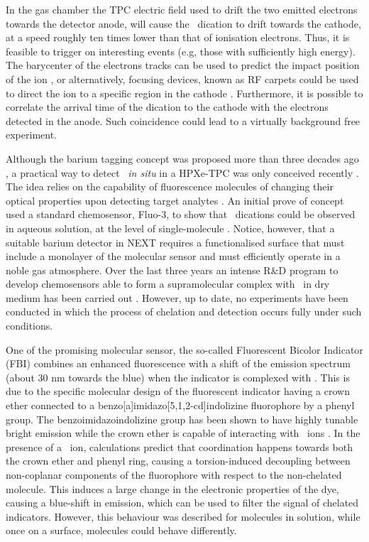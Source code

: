 \documentclass[aps,prl,reprint,longbibliography,superscriptaddress, english]{revtex4-1}
\begin{document}
In the gas chamber the TPC electric field used to drift the two emitted electrons towards the detector anode, will cause the \Bapp\ dication to drift towards the cathode, at a speed roughly ten times lower than that of ionisation electrons. Thus, it is feasible to trigger on interesting events (e.g, those with sufficiently high energy). The barycenter of the electrons tracks can be used to predict the impact position of the ion \cite{rivilla_fluorescent_2020}, or alternatively, focusing devices, known as RF carpets could be used to direct the ion to a specific region in the cathode \cite{NEXT:2021idl}. Furthermore, it is possible to correlate the arrival time of the dication to the cathode with the electrons detected in the anode.
Such coincidence could lead to a virtually background free experiment. 

Although the barium tagging concept was proposed more than three decades ago \cite{Moe:1991ik}, a practical way to detect \Bapp\ {\it in situ} in a HPXe-TPC was only conceived recently \cite{Nygren_2015, Jones:2016qiq}. The idea relies on the capability of fluorescence molecules of changing their optical properties upon detecting target analytes \cite{valeur_chemical,wolfbeis_materials_2005}. An initial prove of concept used a standard chemosensor, Fluo-3, to show that \Bapp\ dications could be observed in aqueous solution, at the level of single-molecule \cite{McDonald:2017izm}. Notice, however, that a suitable barium detector in NEXT requires a functionalised surface that must include a monolayer of the molecular sensor and must efficiently operate in a noble gas atmosphere. Over the last three years an intense R\&D program to develop chemosensors able to form a supramolecular complex with \Bapp\ in dry medium has been carried out \cite{Thapa:2019zjk, rivilla_fluorescent_2020,thapa_demonstration_2021}. However, up to date, no experiments have been conducted in which the process of chelation and detection occurs fully under such conditions.

One of the promising molecular sensor, the so-called 
Fluorescent Bicolor Indicator (FBI) \cite{rivilla_fluorescent_2020} combines an enhanced fluorescence with a shift of the emission spectrum (about 30 nm towards the blue) when the indicator is complexed with \Bapp.  This is due to the specific molecular design of the fluorescent indicator having a crown ether connected to a benzo[a]imidazo[5,1,2-cd]indolizine fluorophore by a phenyl group. The benzoimidazoindolizine group has been shown to have highly tunable bright emission\cite{Stasyuk_benzo,Levesque_general} while the crown ether is capable of interacting with \Bapp\ ions \cite{valeur_chemical,maleknia_cavity-size-dependent_2002}. In the presence of a \Bapp\ ion, calculations predict that coordination happens towards both the crown ether and phenyl ring, causing a  {torsion-induced decoupling between non-coplanar components of the fluorophore with respect} to the non-chelated molecule. This induces a large change in the electronic properties of the dye, causing a blue-shift in emission, which can be used to filter the signal of chelated indicators.
However, this behaviour was described for molecules in solution, while once on a surface, molecules could behave differently.
\end{document}
